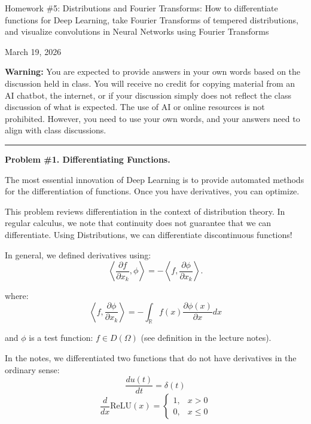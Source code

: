 \documentclass[11pt]{article}
\begin{document}
	
	\begin{center}
		{\Large Homework \#5: Distributions and Fourier Transforms: How to differentiate functions for Deep Learning, take Fourier Transforms of tempered distributions, and visualize convolutions in Neural Networks using Fourier Transforms}
		
		\vspace{0.5em}
		March 19, 2026
	\end{center}
	
	\textbf{Warning:} You are expected to provide answers in your own words based on the discussion held in class. You will receive no credit for copying material from an AI chatbot, the internet, or if your discussion simply does not reflect the class discussion of what is expected. The use of AI or online resources is not prohibited. However, you need to use your own words, and your answers need to align with class discussions.
	
	\hrule
	\vspace{1em}
	
	\textbf{Problem \#1. Differentiating Functions.}
	
	The most essential innovation of Deep Learning is to provide automated methods for the differentiation of functions. Once you have derivatives, you can optimize.
	
	This problem reviews differentiation in the context of distribution theory. In regular calculus, we note that continuity does not guarantee that we can differentiate. Using Distributions, we can differentiate discontinuous functions!
	
	In general, we defined derivatives using:
	\[
	\left\langle \frac{\partial f}{\partial x_k}, \phi \right\rangle
	= -
	\left\langle f, \frac{\partial \phi}{\partial x_k} \right\rangle.
	\]
	
	where:
	\[
	\left\langle f, \frac{\partial \phi}{\partial x_k} \right\rangle
	= -
	\int_{\mathbb{R}} f(x) \frac{\partial \phi(x)}{\partial x} dx
	\]
	
	and $\phi$ is a test function: $f \in D(\Omega)$ (see definition in the lecture notes).
	
	In the notes, we differentiated two functions that do not have derivatives in the ordinary sense:
	\[
	\frac{d u(t)}{dt} = \delta(t)
	\]
	\[
	\frac{d}{dx}\text{ReLU}(x) =
	\begin{cases}
		1, & x > 0 \\
		0, & x \le 0
	\end{cases}
	\]
	
\end{document}
